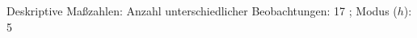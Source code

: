 				\label{tableValues:bdem07_g1}
				\vspace*{-\baselineskip}
                    \begin{noten}
                	    \note{} Deskriptive Maßzahlen:
                	    Anzahl unterschiedlicher Beobachtungen: 17%
                	    ; 
                	      Modus ($h$): 5
                     \end{noten}



